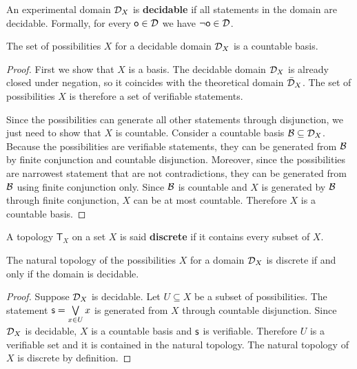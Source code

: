 \documentclass[11pt,letterpaper,fleqn]{memoir} %
\begin{document}
\begin{mathSection}
	
	\begin{defn}
		An experimental domain $\mathcal{D}_X$ is \textbf{decidable} if all statements in the domain are decidable. Formally, for every $\mathsf{o} \in \mathcal{D}$ we have $\neg\mathsf{o} \in \mathcal{D}$.
	\end{defn}

	\begin{prop}
		The set of possibilities $X$ for a decidable domain $\mathcal{D}_X$ is a countable basis.
	\end{prop}
	
	\begin{proof}
		First we show that $X$ is a basis. The decidable domain $\mathcal{D}_X$ is already closed under negation, so it coincides with the theoretical domain $\bar{\mathcal{D}}_X$. The set of possibilities $X$ is therefore a set of verifiable statements.
		
		Since the possibilities can generate all other statements through disjunction, we just need to show that $X$ is countable. Consider a countable basis $\mathcal{B} \subseteq \mathcal{D}_X$. Because the possibilities are verifiable statements, they can be generated from $\mathcal{B}$ by finite conjunction and countable disjunction. Moreover, since the possibilities are narrowest statement that are not contradictions, they can be generated from $\mathcal{B}$ using finite conjunction only. Since $\mathcal{B}$ is countable and $X$ is generated by $\mathcal{B}$ through finite conjunction, $X$ can be at most countable. Therefore $X$ is a countable basis.
	\end{proof}
		
	\begin{defn}
		A topology $\mathsf{T}_X$ on a set $X$ is said \textbf{discrete} if it contains every subset of $X$.
	\end{defn}
	
\begin{thrm}\label{thrm_decidablity_is_discreteness}
	The natural topology of the possibilities $X$ for a domain $\mathcal{D}_X$ is discrete if and only if the domain is decidable.
\end{thrm}
\begin{proof}
	Suppose $\mathcal{D}_X$ is decidable. Let $U \subseteq X$ be a subset of possibilities. The statement $\mathsf{s} = \bigvee\limits_{x \in U} x$ is generated from $X$ through countable disjunction. Since $\mathcal{D}_X$ is decidable, $X$ is a countable basis and $\mathsf{s}$ is verifiable. Therefore $U$ is a verifiable set and it is contained in the natural topology. The natural topology of $X$ is discrete by definition.
	

\end{proof}
\end{mathSection}
\end{document}
